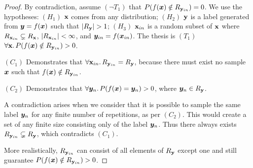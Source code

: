 \begin{proof}
By contradiction, assume $(\neg T_1)$ that $P(f({\bm{x}}) \notin R_{{\mathbf{y}}_{in}}) = 0$. We use the hypotheses: $(H_1)$ ${\mathbf{x}}$ comes from any distribution; $(H_2)$ ${\mathbf{y}}$ is a label generated from ${\bm{y}} = f({\bm{x}})$ such that $|R_{\mathbf{y}}| > 1$; $(H_3)$ ${\mathbf{x}}_{in}$ is a random subset of ${\mathbf{x}}$ where $R_{{\mathbf{x}}_{in}} \subsetneq R_{\mathbf{x}}$, $|R_{{\mathbf{x}}_{in}}| < \infty$, and ${\bm{y}}_{in} = f({\bm{x}}_{in})$. The thesis is $(T_1)$ $\forall {\mathbf{x}}.\, P(f({\bm{x}}) \notin R_{{\mathbf{y}}_{in}}) > 0$.

$(C_1)$ Demonstrates that $\forall {\mathbf{x}}_{in}.\, R_{{\mathbf{y}}_{in}} = R_{{\mathbf{y}}}$, because there must exist no sample ${\bm{x}}$ such that $f({\bm{x}}) \notin R_{{\mathbf{y}}_{in}}$.

$(C_2)$ Demonstrates that $\forall {\bm{y}}_n.\, P(f({\bm{x}}) = {\bm{y}}_n) > 0$, where ${\bm{y}}_n \in R_{\mathbf{y}}$.

A contradiction arises when we consider that it is possible to sample the same label ${\bm{y}}_n$ for any finite number of repetitions, as per $(C_2)$. This would create a set of any finite size consisting only of the label ${\bm{y}}_n$. Thus there always exists $R_{{\mathbf{y}}_{in}} \subsetneq R_{{\mathbf{y}}}$, which contradicts $(C_1)$.

More realistically, $R_{{\mathbf{y}}_{in}}$ can consist of all elements of $R_{{\mathbf{y}}}$ except one and still guarantee $P(f({\bm{x}}) \notin R_{{\mathbf{y}}_{in}}) > 0$.
\end{proof}
